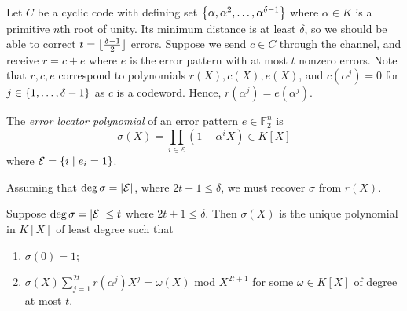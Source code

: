 Let \( C \) be a cyclic code with defining set \( \qty{\alpha, \alpha^2, \dots, \alpha^{\delta - 1}} \) where \( \alpha \in K \) is a primitive \( n \)th root of unity.
Its minimum distance is at least \( \delta \), so we should be able to correct \( t = \lfloor\frac{\delta - 1}{2}\rfloor \) errors.
Suppose we send \( c \in C \) through the channel, and receive \( r = c + e \) where \( e \) is the error pattern with at most \( t \) nonzero errors.
Note that \( r, c, e \) correspond to polynomials \( r(X), c(X), e(X) \), and \( c(\alpha^j) = 0 \) for \( j \in \qty{1, \dots, \delta - 1} \) as \( c \) is a codeword.
Hence, \( r(\alpha^j) = e(\alpha^j) \).
\begin{definition}
    The \emph{error locator polynomial} of an error pattern \( e \in \mathbb F_2^n \) is
    \[ \sigma(X) = \prod_{i \in \mathcal E} (1 - \alpha^i X) \in K[X] \]
    where \( \mathcal E = \qty{i \mid e_i = 1} \).
\end{definition}
Assuming that \( \deg \sigma = \abs{\mathcal E} \), where \( 2t + 1 \leq \delta \), we must recover \( \sigma \) from \( r(X) \).
\begin{theorem}
    Suppose \( \deg \sigma = \abs{\mathcal E} \leq t \) where \( 2t + 1 \leq \delta \).
    Then \( \sigma(X) \) is the unique polynomial in \( K[X] \) of least degree such that
    \begin{enumerate}
        \item \( \sigma(0) = 1 \);
        \item \( \sigma(X) \sum_{j=1}^{2t} r(\alpha^j) X^j = \omega(X) \) mod \( X^{2t+1} \) for some \( \omega \in K[X] \) of degree at most \( t \).
    \end{enumerate}
\end{theorem}
